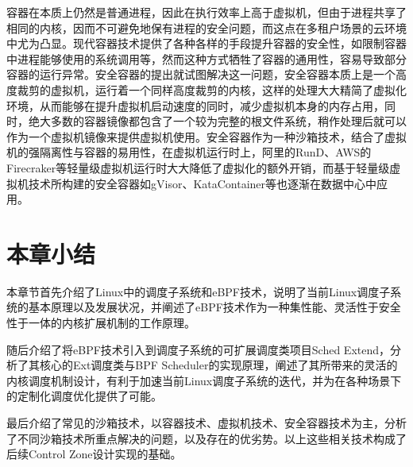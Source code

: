 容器在本质上仍然是普通进程，因此在执行效率上高于虚拟机，但由于进程共享了相同的内核，因而不可避免地保有进程的安全问题，而这点在多租户场景的云环境中尤为凸显。现代容器技术提供了各种各样的手段提升容器的安全性，如限制容器中进程能够使用的系统调用等，然而这种方式牺牲了容器的通用性，容易导致部分容器的运行异常。安全容器的提出就试图解决这一问题，安全容器本质上是一个高度裁剪的虚拟机，运行着一个同样高度裁剪的内核，这样的处理大大精简了虚拟化环境，从而能够在提升虚拟机启动速度的同时，减少虚拟机本身的内存占用，同时，绝大多数的容器镜像都包含了一个较为完整的根文件系统，稍作处理后就可以作为一个虚拟机镜像来提供虚拟机使用。安全容器作为一种沙箱技术，结合了虚拟机的强隔离性与容器的易用性，在虚拟机运行时上，阿里的RunD\citep{li2022rund}、AWS的Firecraker\citep{agache2020firecracker}等轻量级虚拟机运行时大大降低了虚拟化的额外开销，而基于轻量级虚拟机技术所构建的安全容器如gVisor、KataContainer\citep{randazzo2019kata}等也逐渐在数据中心中应用。

\section{本章小结}

本章节首先介绍了Linux中的调度子系统和eBPF技术，说明了当前Linux调度子系统的基本原理以及发展状况，并阐述了eBPF技术作为一种集性能、灵活性于安全性于一体的内核扩展机制的工作原理。

随后介绍了将eBPF技术引入到调度子系统的可扩展调度类项目Sched Extend，分析了其核心的Ext调度类与BPF Scheduler的实现原理，阐述了其所带来的灵活的内核调度机制设计，有利于加速当前Linux调度子系统的迭代，并为在各种场景下的定制化调度优化提供了可能。

最后介绍了常见的沙箱技术，以容器技术、虚拟机技术、安全容器技术为主，分析了不同沙箱技术所重点解决的问题，以及存在的优劣势。以上这些相关技术构成了后续Control Zone设计实现的基础。